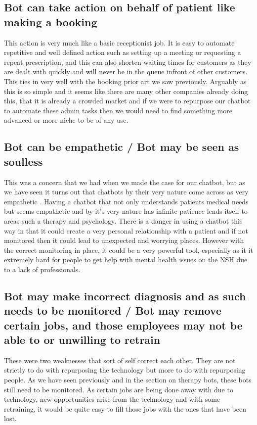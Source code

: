 \documentclass{article}
\begin{document}
\subsection{Bot can take action on behalf of patient like making a booking}
This action is very much like a basic receptionist job. It is easy to automate repetitive and well defined action such as setting up a meeting or requesting a repeat prescription, and this can also shorten waiting times for customers as they are dealt with quickly and will never be in the queue infront of other customers. This ties in very well with the booking prior art we saw previously. Arguably as this is so simple and it seems like there are many other companies already doing this, that it is already a crowded market and if we were to repurpose our chatbot to automate these admin tasks then we would need to find something more advanced or more niche to be of any use.

\subsection{Bot can be empathetic / Bot may be seen as soulless}
This was a concern that we had when we made the case for our chatbot, but as we have seen it turns out that chatbots by their very nature come across as very empathetic \cite{bedside}. Having a chatbot that not only understands patients medical needs but seems empathetic and by it's very nature has infinite patience lends itself to areas such a therapy and psychology. There is a danger in using a chatbot this way in that it could create a very personal relationship with a patient and if not monitored then it could lead to unexpected and worrying places. However with the correct monitoring in place, it could be a very powerful tool, especially as it it extremely hard for people to get help with mental health issues on the NSH due to a lack of professionals. 

\subsection{Bot may make incorrect diagnosis and as such needs to be monitored / Bot may remove certain jobs, and those employees may not be able to or unwilling to retrain}
These were two weaknesses that sort of self correct each other. They are not strictly to do with repurposing the technology but more to do with repurposing people. As we have seen previously and in the section on therapy bots, these bots still need to be monitored. As certain jobs are being done away with due to technology, new opportunities arise from the technology and with some retraining, it would be quite easy to fill those jobs with the ones that have been lost.


\end{document}
